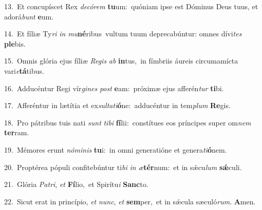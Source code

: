 {\numbfont\textcolor{\numbcolor}{13.}}~Et concupíscet Rex \textit{de}\-\textit{có}\textit{rem} \textbf{tu}\-um:~\star quóniam ipse est Dóminus Deus tuus, et adorá\textit{bunt} \textbf{e}\-um.\par
{\numbfont\textcolor{\numbcolor}{14.}}~Et fíliæ Ty\textit{ri} \textit{in} \textit{mu}\-\textbf{né}ribus~\star vultum tuum deprecabúntur: omnes dívi\textit{tes} \textbf{ple}\-bis.\par
{\numbfont\textcolor{\numbcolor}{15.}}~Omnis glória ejus fíliæ \textit{Re}\-\textit{gis} \textit{ab} \textbf{in}\-tus,~\star in fímbriis áureis circumamícta vari\-\textit{e}\-\textbf{tá}tibus.\par
{\numbfont\textcolor{\numbcolor}{16.}}~Adducéntur Regi vír\-\textit{gi}\-\textit{nes} \textit{post} \textbf{e}\-am:~\star próximæ ejus afferén\textit{tur} \textbf{ti}\-bi.\par
{\numbfont\textcolor{\numbcolor}{17.}}~Afferéntur in lætítia et ex\-\textit{sul}\-\textit{ta}\textit{ti}\textbf{ó}ne:~\star adducéntur in tem\textit{plum} \textbf{Re}\-gis.\par
{\numbfont\textcolor{\numbcolor}{18.}}~Pro pátribus tuis nati \textit{sunt} \textit{ti}\-\textit{bi} \textbf{fí}\-lii:~\star constítues eos príncipes super om\textit{nem} \textbf{ter}\-ram.\par
{\numbfont\textcolor{\numbcolor}{19.}}~Mémores erunt \textit{nó}\-\textit{mi}\textit{nis} \textbf{tu}\-i:~\star in omni generatióne et genera\-\textit{ti}\-\textbf{ó}nem.\par
{\numbfont\textcolor{\numbcolor}{20.}}~Proptérea pópuli confitebúntur ti\textit{bi} \textit{in} \textit{æ}\-\textbf{tér}num:~\star et in sǽcu\textit{lum} \textbf{sǽ}\-culi.\par
{\numbfont\textcolor{\numbcolor}{21.}}~Glória \textit{Pa}\-\textit{tri}, \textit{et} \textbf{Fí}\-lio,~\star et Spirítu\textit{i} \textbf{Sanc}\-to.\par
{\numbfont\textcolor{\numbcolor}{22.}}~Sicut erat in princípio, \textit{et} \textit{nunc}\-, \textit{et} \textbf{sem}\-per,~\star et in sǽcula sæculó\-\textit{rum}\-. \textbf{A}\-men.\par

